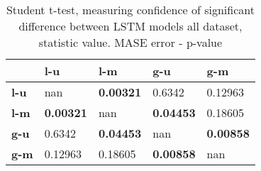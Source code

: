\begin{table}[h]
\centering
\caption{Student t-test, measuring confidence of significant difference between LSTM models all dataset, statistic value. MASE error - p-value}
\label{table:ttest-p-values-lstm-experiments-MASE-all-datasets}
\begin{tabular}{lllll}
\toprule
{} &               l-u &               l-m &               g-u &               g-m \\
\midrule
\textbf{l-u} &               nan &  \textbf{0.00321} &            0.6342 &           0.12963 \\
\textbf{l-m} &  \textbf{0.00321} &               nan &  \textbf{0.04453} &           0.18605 \\
\textbf{g-u} &            0.6342 &  \textbf{0.04453} &               nan &  \textbf{0.00858} \\
\textbf{g-m} &           0.12963 &           0.18605 &  \textbf{0.00858} &               nan \\
\bottomrule
\end{tabular}
\end{table}
